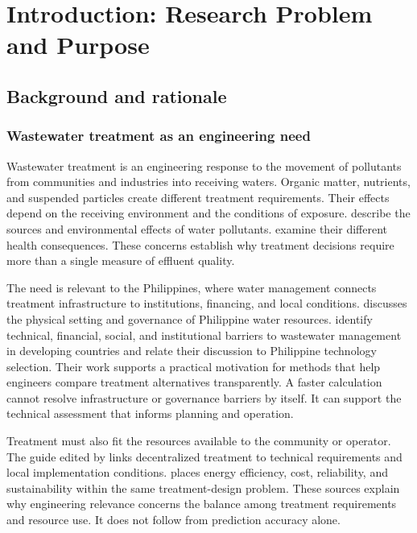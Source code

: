 \chapter{Introduction: Research Problem and Purpose}
\label{ch:introduction}

\section{Background and rationale}

\subsection{Wastewater treatment as an engineering need}

Wastewater treatment is an engineering response to the movement of pollutants from communities and industries into receiving waters. Organic matter, nutrients, and suspended particles create different treatment requirements. Their effects depend on the receiving environment and the conditions of exposure. \citet{Madhav2019} describe the sources and environmental effects of water pollutants. \citet{Lin2022} examine their different health consequences. These concerns establish why treatment decisions require more than a single measure of effluent quality.

The need is relevant to the Philippines, where water management connects treatment infrastructure to institutions, financing, and local conditions. \citet{Tabios2020} discusses the physical setting and governance of Philippine water resources. \citet{DamalerioBarriers2022} identify technical, financial, social, and institutional barriers to wastewater management in developing countries and relate their discussion to Philippine technology selection. Their work supports a practical motivation for methods that help engineers compare treatment alternatives transparently. A faster calculation cannot resolve infrastructure or governance barriers by itself. It can support the technical assessment that informs planning and operation.

Treatment must also fit the resources available to the community or operator. The guide edited by \citet{Ulrich2009} links decentralized treatment to technical requirements and local implementation conditions. \citet{Jafarinejad2020} places energy efficiency, cost, reliability, and sustainability within the same treatment-design problem. These sources explain why engineering relevance concerns the balance among treatment requirements and resource use. It does not follow from prediction accuracy alone.

